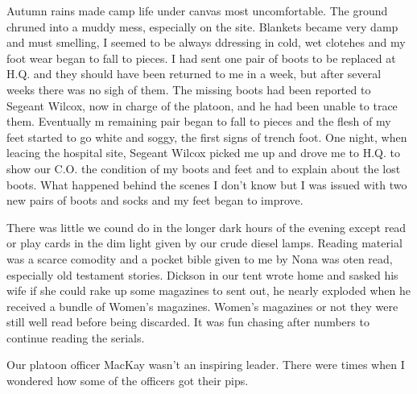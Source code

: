 Autumn rains made camp life under canvas most uncomfortable. The
ground chruned into a muddy mess, especially on the site. Blankets
became very damp and must smelling, I seemed to be always ddressing in
cold, wet clotehes and my foot wear began to fall to pieces. I had
sent one pair of boots to be replaced at H.Q. and they should have
been returned to me in a week, but after several weeks there was no
sigh of them. The missing boots had been reported to Segeant Wilcox,
now in charge of the platoon, and he had been unable to trace
them. Eventually m remaining pair began to fall to pieces and the
flesh of my feet started to go white and soggy, the first signs of
trench foot. One night, when leacing the hospital site, Segeant Wilcox
picked me up and drove me to H.Q. to show our C.O. the condition of my
boots and feet and to explain about the lost boots. What happened
behind the scenes I don't know but I was issued with two new pairs of
boots and socks and my feet began to improve.

There was little we cound do in the longer dark hours of the evening except read or play cards in the dim light given by our crude diesel lamps. Reading material was a scarce comodity and a pocket bible given to me by Nona was oten read, especially old testament stories. \Sapper Dickson in our tent wrote home and sasked his wife if she could rake up some magazines to sent out, he nearly exploded when he received a bundle of Women's magazines. Women's magazines or not they were still well read before being discarded. It was fun chasing after numbers to continue reading the serials. 

Our platoon officer \lieutenant MacKay wasn't an inspiring leader. There were times when I wondered how some of the officers got their pips.

